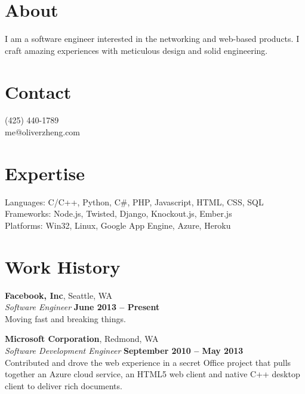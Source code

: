 \documentclass[margin,line]{resume}
\begin{document}
\begin{resume}

	\section{\mysidestyle About}
	I am a software engineer interested in the networking and web-based
	products. I craft amazing experiences with meticulous design and solid
	engineering.

	\section{\mysidestyle Contact}
	(425) 440-1789
		\vspace{1mm}\\
	me@oliverzheng.com

	\section{\mysidestyle Expertise}
	Languages: C/C++, Python, C{\#}, PHP, Javascript, HTML, CSS, SQL
		\vspace{1mm}\\
	Frameworks: Node.js, Twisted, Django, Knockout.js, Ember.js
		\vspace{1mm}\\
	Platforms: Win32, Linux, Google App Engine, Azure, Heroku

	\section{\mysidestyle Work History}

	\textbf{Facebook, Inc}, Seattle, WA \vspace{2mm}\\\vspace{1mm}%
	\textsl{Software Engineer} \hfill
	\textbf{June 2013 -- Present}\\
	Moving fast and breaking things.

	\textbf{Microsoft Corporation}, Redmond, WA \vspace{2mm}\\\vspace{1mm}%
	\textsl{Software Development Engineer} \hfill
	\textbf{September 2010 -- May 2013}\\
	Contributed and drove the web experience in a secret Office project that
	pulls together an Azure cloud service, an HTML5 web client and native C++
	desktop client to deliver rich documents.


\end{resume}
\end{document}

